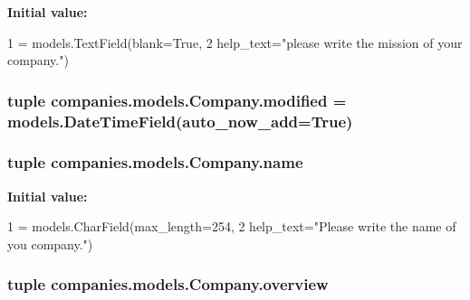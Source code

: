{\bfseries Initial value\-:}
\begin{DoxyCode}
1 = models.TextField(blank=\textcolor{keyword}{True},
2                                help\_text=\textcolor{stringliteral}{"please write the mission of your company."})
\end{DoxyCode}
\hypertarget{classcompanies_1_1models_1_1_company_ab0496353663cfe89edf470b3cf9bbd86}{
\subsubsection[{modified}]{\setlength{\rightskip}{0pt plus 5cm}tuple companies.\-models.\-Company.\-modified = models.\-Date\-Time\-Field(auto\-\_\-now\-\_\-add=True)\hspace{0.3cm}{\ttfamily [static]}}}\label{classcompanies_1_1models_1_1_company_ab0496353663cfe89edf470b3cf9bbd86}
\hypertarget{classcompanies_1_1models_1_1_company_ac1999fad5498a637267c69735dfacae8}{
\subsubsection[{name}]{\setlength{\rightskip}{0pt plus 5cm}tuple companies.\-models.\-Company.\-name\hspace{0.3cm}{\ttfamily [static]}}}\label{classcompanies_1_1models_1_1_company_ac1999fad5498a637267c69735dfacae8}
{\bfseries Initial value\-:}
\begin{DoxyCode}
1 = models.CharField(max\_length=254,
2                             help\_text=\textcolor{stringliteral}{"Please write the name of you company."})
\end{DoxyCode}
\hypertarget{classcompanies_1_1models_1_1_company_ae4e99a8aab4627625925eec5018d5821}{
\subsubsection[{overview}]{\setlength{\rightskip}{0pt plus 5cm}tuple companies.\-models.\-Company.\-overview\hspace{0.3cm}{\ttfamily [static]}}}\label{classcompanies_1_1models_1_1_company_ae4e99a8aab4627625925eec5018d5821}
